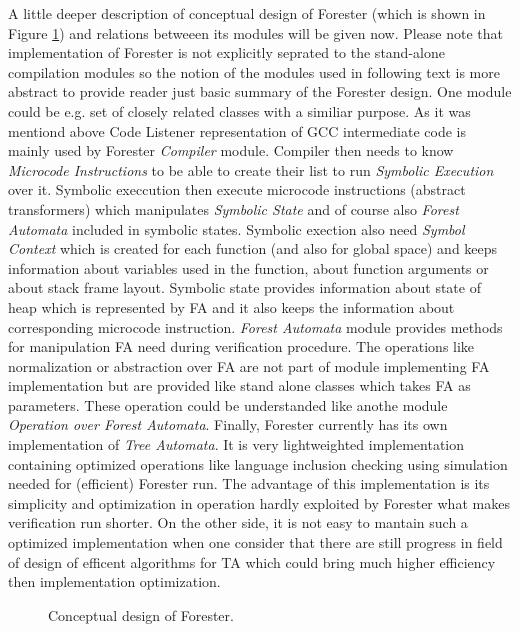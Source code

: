 A little deeper description of conceptual design of Forester (which is shown in Figure \ref{fig:fa_design}) and relations
betweeen its modules will be given now.
Please note that implementation of Forester is not explicitly seprated to the stand-alone compilation modules so the notion of the modules
used in following text is more abstract to provide reader just basic summary of the Forester design.
One module could be e.g. set of closely related classes with a similiar purpose.
As it was mentiond above Code Listener representation of GCC intermediate code is mainly used by Forester \emph{Compiler} module.
Compiler then needs to know \emph{Microcode Instructions} to be able to create their list to run \emph{Symbolic Execution} over it.
Symbolic execcution then execute microcode instructions (abstract transformers) which manipulates \emph{Symbolic State} and of course
also \emph{Forest Automata} included in symbolic states.
Symbolic exection also need \emph{Symbol Context} which is created for each function (and also for global space)
and keeps information about variables used in the function, about function arguments or about stack frame layout.
Symbolic state provides information about state of heap which is represented by FA and it also keeps the information about
corresponding microcode instruction.
\emph{Forest Automata} module provides methods for manipulation FA need during verification procedure.
The operations like normalization or abstraction over FA are not part of module implementing FA implementation but are provided
like stand alone classes which takes FA as parameters.
These operation could be understanded like anothe module \emph{Operation over Forest Automata}.
Finally, Forester currently has its own implementation of \emph{Tree Automata}.
It is very lightweighted implementation containing optimized operations like language inclusion checking using simulation needed for (efficient) Forester run.
The advantage of this implementation is its simplicity and optimization in operation hardly exploited by Forester what makes verification run shorter.
On the other side, it is not easy to mantain such a optimized implementation when one consider that there are still progress in field of design of efficent algorithms
for TA which could bring much higher efficiency then implementation optimization.
\begin{figure}[bt]
	\begin{center}
		
	\end{center}
	\caption{Conceptual design of Forester.}
	\label{fig:fa_design}
\end{figure}

